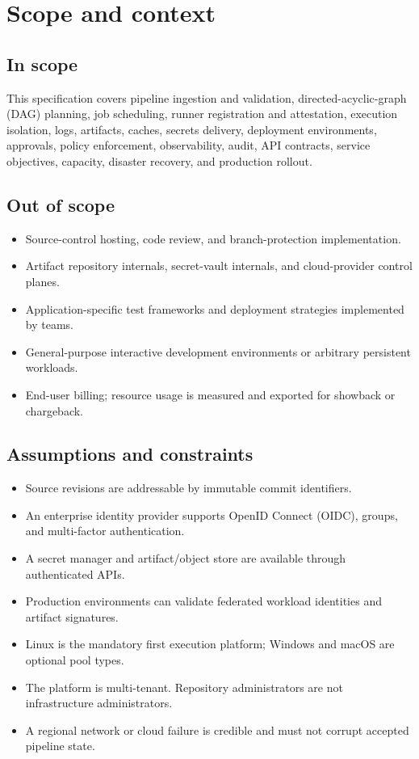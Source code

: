 \section{Scope and context}

\subsection{In scope}

This specification covers pipeline ingestion and validation, directed-acyclic-graph
(DAG) planning, job scheduling, runner registration and attestation, execution
isolation, logs, artifacts, caches, secrets delivery, deployment environments,
approvals, policy enforcement, observability, audit, API contracts, service objectives,
capacity, disaster recovery, and production rollout.

\subsection{Out of scope}

\begin{itemize}
  \item Source-control hosting, code review, and branch-protection implementation.
  \item Artifact repository internals, secret-vault internals, and cloud-provider control planes.
  \item Application-specific test frameworks and deployment strategies implemented by teams.
  \item General-purpose interactive development environments or arbitrary persistent workloads.
  \item End-user billing; resource usage is measured and exported for showback or chargeback.
\end{itemize}

\subsection{Assumptions and constraints}

\begin{itemize}
  \item Source revisions are addressable by immutable commit identifiers.
  \item An enterprise identity provider supports OpenID Connect (OIDC), groups, and multi-factor authentication.
  \item A secret manager and artifact/object store are available through authenticated APIs.
  \item Production environments can validate federated workload identities and artifact signatures.
  \item Linux is the mandatory first execution platform; Windows and macOS are optional pool types.
  \item The platform is multi-tenant. Repository administrators are not infrastructure administrators.
  \item A regional network or cloud failure is credible and must not corrupt accepted pipeline state.
\end{itemize}

